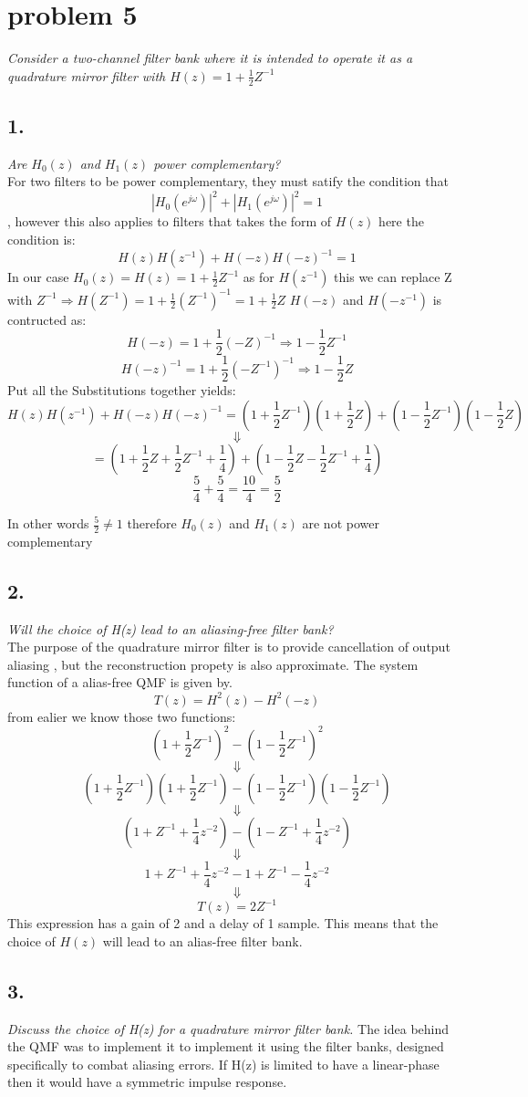 \section{problem 5}
\textit{Consider a two-channel filter bank where it is intended to operate it as a quadrature mirror filter 
with $H(z) = 1+\frac{1}{2}Z^{-1}$ }

\subsection{1.}
\textit{Are $H_0(z)$ and $H_1(z)$ power complementary?}\\
For two filters to be power complementary, they must satify the condition that
\[|H_0(e^{j\omega})|^2 + |H_1(e^{j\omega})|^2 = 1\], however this also applies to filters that takes the form of $H(z)$
here the condition is:
\[H(z)H(z^{-1})+H(-z)H(-z)^{-1} = 1\]
In our case $H_0(z) = H(z) = 1+\frac{1}{2}Z^{-1}$
as for $H(z^{-1})$ this we can replace Z with $Z^{-1} \Rightarrow H(Z^{-1}) = 1+\frac{1}{2}(Z^{-1})^{-1} = 1+\frac{1}{2}Z$ 
$H(-z)$ and $H(-z^{-1})$ is contructed as:
\[H(-z) = 1 + \frac{1}{2}(-Z)^{-1}\Rightarrow 1-\frac{1}{2}Z^{-1}\]
\[H(-z)^{-1} = 1 + \frac{1}{2}(-Z^{-1})^{-1} \Rightarrow 1 -\frac{1}{2}Z\]
Put all the Substitutions together yields:
\[H(z)H(z^{-1})+H(-z)H(-z)^{-1} = (1+\frac{1}{2}Z^{-1})(1+\frac{1}{2}Z)+(1-\frac{1}{2}Z^{-1})(1 -\frac{1}{2}Z)\]
\[\Downarrow\]
\[=(1+\frac{1}{2}Z + \frac{1}{2}Z^{-1}+\frac{1}{4}) + (1 - \frac{1}{2}Z - \frac{1}{2}Z^{-1}+\frac{1}{4})\]
\[\frac{5}{4}+\frac{5}{4} = \frac{10}{4} = \frac{5}{2}\]

In other words
$\frac{5}{2} \neq 1$ therefore $H_0(z)$ and $H_1(z)$ are not power complementary

\subsection{2.}
\textit{Will the choice of H(z) lead to an aliasing-free filter bank?}\\
The purpose of the quadrature mirror filter is to provide cancellation of output aliasing
, but the reconstruction propety is also approximate. 
The system function of a alias-free QMF is given by.
\[T(z) = H^2(z) - H^2(-z)\]
from ealier we know those two functions:
\[(1+\frac{1}{2}Z^{-1})^2 - (1-\frac{1}{2}Z^{-1})^2\]
\[\Downarrow\]
\[(1+\frac{1}{2}Z^{-1})(1+\frac{1}{2}Z^{-1}) - (1-\frac{1}{2}Z^{-1})(1-\frac{1}{2}Z^{-1})\]
\[\Downarrow\]
\[(1 + Z^{-1} + \frac{1}{4}z^{-2}) - (1-Z^{-1}+\frac{1}{4}z^{-2})\]
\[\Downarrow\]
\[1 + Z^{-1} + \frac{1}{4}z^{-2} - 1+Z^{-1}-\frac{1}{4}z^{-2}\]
\[\Downarrow\]
\[T(z) = 2Z^{-1}\]
This expression has a gain of 2 and a delay of 1 sample. This means that the choice of $H(z)$ will lead to an
alias-free filter bank.


\subsection{3.}
\textit{Discuss the choice of H(z) for a quadrature mirror filter bank.}
The idea behind the QMF was to implement it to implement
it using the filter banks, designed specifically to combat aliasing errors. If H(z) is limited to 
have a linear-phase then it would have a symmetric impulse response.